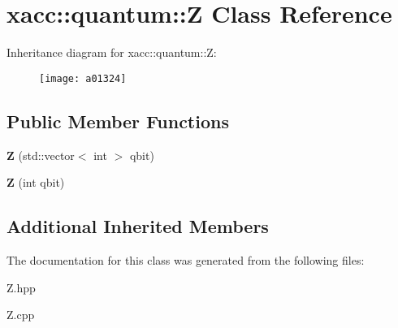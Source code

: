 \hypertarget{a01324}{}\section{xacc\+:\+:quantum\+:\+:Z Class Reference}
\label{a01324}
Inheritance diagram for xacc\+:\+:quantum\+:\+:Z\+:\begin{figure}[H]
\begin{center}
\leavevmode
\texttt{[image: a01324]}
\end{center}
\end{figure}
\subsection*{Public Member Functions}
\begin{DoxyCompactItemize}
\item 
\mbox{\label{a01324_a5f1d311b357faed8c2665fe20cf24aeb}} 
{\bfseries Z} (std\+::vector$<$ int $>$ qbit)
\item 
\mbox{\label{a01324_aa1bb7e533e7595e9ecd06879a2f8d2de}} 
{\bfseries Z} (int qbit)
\end{DoxyCompactItemize}
\subsection*{Additional Inherited Members}


The documentation for this class was generated from the following files\+:\begin{DoxyCompactItemize}
\item 
Z.\+hpp\item 
Z.\+cpp\end{DoxyCompactItemize}
